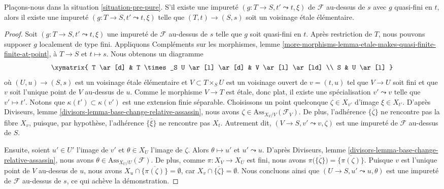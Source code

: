 \begin{lemma}
\label{lemma-quasi-finite-impurity-elementary}
Plaçons-nous dans la situation \ref{situation-pre-pure}.
S'il existe une impureté $(g : T \to S, t' \leadsto t, \xi)$
de $\mathcal{F}$ au-dessus de $s$ avec $g$ quasi-fini en $t$, alors il
existe une impureté $(g : T \to S, t' \leadsto t, \xi)$ telle que
$(T, t) \to (S, s)$ soit un voisinage \'etale élémentaire.
\end{lemma}

\begin{proof}
Soit $(g : T \to S, t' \leadsto t, \xi)$ une impureté de
$\mathcal{F}$ au-dessus de $s$ telle que $g$ soit quasi-fini en $t$.
Après restriction de $T$, nous pouvons supposer $g$ localement de type fini.
Appliquons
Compléments sur les morphismes,
lemme \ref{more-morphisms-lemma-etale-makes-quasi-finite-finite-at-point},
à $T \to S$ et $t \mapsto s$. Nous obtenons un diagramme
$$
\xymatrix{
T \ar[d] & T \times_S U \ar[l] \ar[d] & V \ar[l] \ar[ld] \\
S & U \ar[l]
}
$$
où $(U, u) \to (S, s)$ est un voisinage \'etale élémentaire
et $V \subset T \times_S U$ est un voisinage ouvert de $v = (t, u)$
tel que $V \to U$ soit fini et que $v$ soit l'unique point de $V$
au-dessus de $u$. Comme le morphisme $V \to T$ est \'etale,
donc plat, il existe une spécialisation $v' \leadsto v$ telle
que $v' \mapsto t'$. Notons que $\kappa(t') \subset \kappa(v')$
est une extension finie séparable. Choisissons un point quelconque $\zeta \in X_{v'}$ d'image
$\xi \in X_{t'}$. D'après
Diviseurs, lemme \ref{divisors-lemma-base-change-relative-assassin},
nous avons $\zeta \in \text{Ass}_{X_V/V}(\mathcal{F}_V)$.
De plus, l'adhérence $\overline{\{\zeta\}}$ ne rencontre pas
la fibre $X_v$, puisque, par hypothèse, l'adhérence $\overline{\{\xi\}}$
ne rencontre pas $X_t$. Autrement dit, $(V \to S, v' \leadsto v, \zeta)$
est une impureté de $\mathcal{F}$ au-dessus de $S$.

\medskip\noindent
Ensuite, soient $u' \in U'$ l'image de $v'$ et
$\theta \in X_U$ l'image de $\zeta$.
Alors $\theta \mapsto u'$ et $u' \leadsto u$.
D'après
Diviseurs, lemme \ref{divisors-lemma-base-change-relative-assassin},
nous avons $\theta \in \text{Ass}_{X_U/U}(\mathcal{F})$.
De plus, comme $\pi : X_V \to X_U$ est fini, nous avons
$\pi\big(\overline{\{\zeta\}}\big) = \overline{\{\pi(\zeta)\}}$. Puisque
$v$ est l'unique point de $V$ au-dessus de $u$, nous avons
$X_u \cap \overline{\{\pi(\zeta)\}} = \emptyset$, car
$X_v \cap \overline{\{\zeta\}} = \emptyset$. Nous concluons ainsi que
$(U \to S, u' \leadsto u, \theta)$ est une impureté de
$\mathcal{F}$ au-dessus de $s$, ce qui achève la démonstration.
\end{proof}

